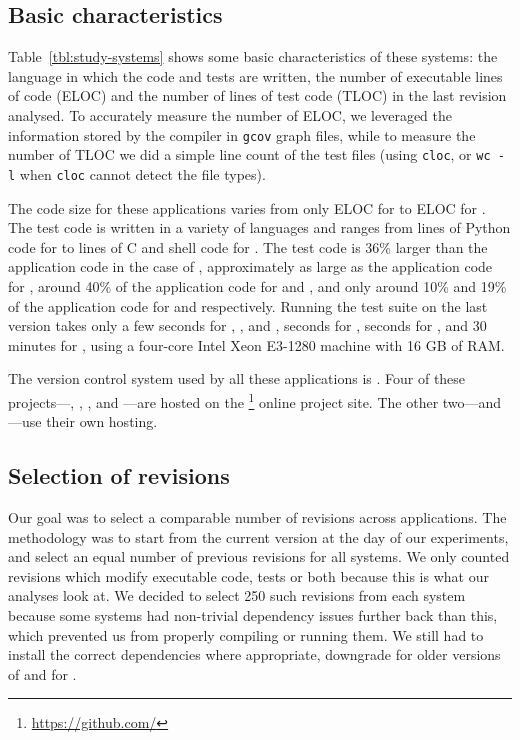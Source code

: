 \subsection{Basic characteristics}

Table~\ref{tbl:study-systems} shows some basic characteristics of these
systems: the language in which the code and tests are written, the number of
executable lines of code (ELOC) and the number of lines of test code (TLOC) in
the last revision analysed. To accurately measure the number of ELOC, we
leveraged the information stored by the compiler in \texttt{gcov} graph files,
while to measure the number of TLOC we did a simple line count of the test
files (using \texttt{cloc}, or \texttt{wc~-l} when \texttt{cloc} cannot detect
the file types).

The code size for these applications varies from only \memcachedSize ELOC for
\memcached to \gitSize ELOC for \git.  The test code is written in a variety of
languages and ranges from \lighttpdtwoTsize lines of Python code for
\lighttpdtwo to \gitTsize lines of C and shell code for \git.  The test code is
36\% larger than the application code in the case of \git, approximately as
large as the application code for \memcached, around 40\% of the application
code for \redis and \zeromq, and only around 10\% and 19\% of the application
code for \lighttpdtwo and \binutils respectively.  Running the test suite on
the last version takes only a few seconds for \binutils, \lighttpdtwo, and
\zeromq, \memcachedTestTime seconds for \memcached, \redisTestTime seconds for
\redis, and 30 minutes for \git, using a four-core Intel Xeon E3-1280 machine
with 16 GB of RAM.

The version control system used by all these applications is \git.  Four of
these projects---\git, \memcached, \redis, and \zeromq ---are hosted on the
\github\footnote{\url{https://github.com/}} online project site.  The other
two---\binutils and \lighttpdtwo---use their own \git hosting.

\subsection{Selection of revisions}

Our goal was to select a comparable number of revisions across applications.
The methodology was to start from the current version at the day of our
experiments, and select an equal number of previous revisions for all systems.
We only counted revisions which modify executable code, tests or both because
this is what our analyses look at. We decided to select 250 such revisions from
each system because some systems had non-trivial dependency issues further back
than this, which prevented us from properly compiling or running them.  We
still had to install the correct dependencies where appropriate, \eg downgrade
 for older versions of \lighttpdtwo and  for
\memcached.


